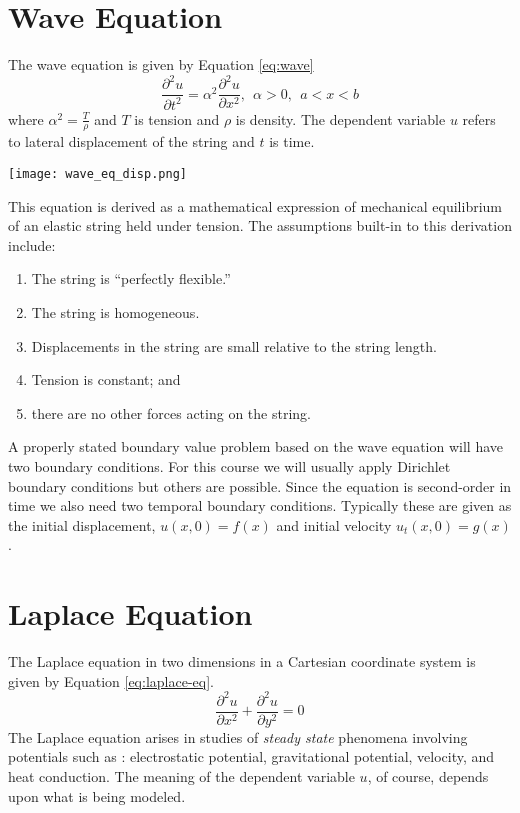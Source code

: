 \section{Wave Equation}

The wave equation is given by Equation \ref{eq:wave}
\begin{equation}
\frac{\partial^2 u}{\partial t^2} = \alpha^2 \frac{\partial^2 u}{\partial x^2}, \ \ \alpha>0, \ \ a<x<b
\label{eq:wave}
\end{equation}
where $\alpha^2 = \frac{T}{\rho}$ and $T$ is tension and $\rho$ is density.  The dependent variable $u$ refers to lateral displacement of the string and $t$ is time.
\begin{marginfigure}
\texttt{[image: wave\_eq\_disp.png]}
\end{marginfigure}

This equation is derived as a mathematical expression of mechanical equilibrium of an elastic string held under tension.  The assumptions built-in to this derivation include:
\begin{enumerate}
\item The string is ``perfectly flexible.'' 
\item The string is homogeneous.
\item Displacements in the string are small relative to the string length.
\item Tension is constant; and
\item there are no other forces acting on the string.
\end{enumerate}
A properly stated boundary value problem based on the wave equation will have two boundary conditions.  For this course we will usually apply Dirichlet boundary conditions but others are possible.  Since the equation is second-order in time we also need two temporal boundary conditions.  Typically these are given as the initial displacement, $u(x,0)=f(x)$ and initial velocity $u_t(x,0)=g(x)$.

\section{Laplace Equation}
The Laplace equation in two dimensions in a Cartesian coordinate system is given by Equation \ref{eq:laplace-eq}.
\begin{equation}
\frac{\partial^2 u}{\partial x^2} + \frac{\partial^2 u}{\partial y^2} = 0
\label{eq:laplace-eq}
\end{equation}
The Laplace equation arises in studies of \emph{steady state} phenomena involving potentials such as : electrostatic potential, gravitational potential, velocity, and heat conduction.  The meaning of the dependent variable $u$, of course, depends upon what is being modeled.  

